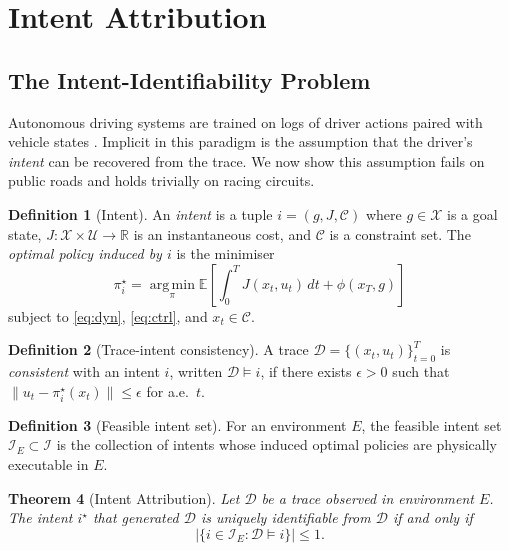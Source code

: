 \documentclass[11pt,twocolumn]{article}
\newtheorem{theorem}{Theorem}
\theoremstyle{definition}
\newtheorem{definition}[theorem]{Definition}
\theoremstyle{remark}
\newcommand{\R}{\mathbb{R}}
\newcommand{\E}{\mathbb{E}}
\newcommand{\argmin}{\operatorname*{arg\,min}}
\providecommand{\cC}{\mathcal{C}}
\providecommand{\cI}{\mathcal{I}}
\providecommand{\cU}{\mathcal{U}}
\providecommand{\cX}{\mathcal{X}}
\begin{document}
\section{Intent Attribution}
\label{sec:intent}

\subsection{The Intent-Identifiability Problem}

Autonomous driving systems are trained on logs of driver actions paired with vehicle states \cite{bansal2019chauffeurnet,codevilla2018endtoend}. Implicit in this paradigm is the assumption that the driver's \emph{intent} can be recovered from the trace. We now show this assumption fails on public roads and holds trivially on racing circuits.

\begin{definition}[Intent]\label{def:intent}
An \emph{intent} is a tuple $i = (g, J, \cC)$ where $g \in \cX$ is a goal state, $J: \cX \times \cU \to \R$ is an instantaneous cost, and $\cC$ is a constraint set. The \emph{optimal policy induced by $i$} is the minimiser
\begin{equation}
\pi_i^{\star} = \argmin_{\pi} \E\left[\int_0^{T} J(x_t, u_t)\,dt + \phi(x_T, g)\right]
\end{equation}
subject to \eqref{eq:dyn}, \eqref{eq:ctrl}, and $x_t \in \cC$.
\end{definition}

\begin{definition}[Trace-intent consistency]\label{def:consistency}
A trace $\mathcal{D} = \{(x_t, u_t)\}_{t=0}^{T}$ is \emph{consistent} with an intent $i$, written $\mathcal{D} \models i$, if there exists $\epsilon > 0$ such that $\|u_t - \pi_i^{\star}(x_t)\| \le \epsilon$ for a.e.\ $t$.
\end{definition}

\begin{definition}[Feasible intent set]\label{def:feasible-intents}
For an environment $E$, the feasible intent set $\cI_E \subset \cI$ is the collection of intents whose induced optimal policies are physically executable in $E$.
\end{definition}

\begin{theorem}[Intent Attribution]\label{thm:intent}
Let $\mathcal{D}$ be a trace observed in environment $E$. The intent $i^{\star}$ that generated $\mathcal{D}$ is uniquely identifiable from $\mathcal{D}$ if and only if
\begin{equation}
|\{i \in \cI_E : \mathcal{D} \models i\}| \le 1.
\end{equation}
\end{theorem}
\end{document}
